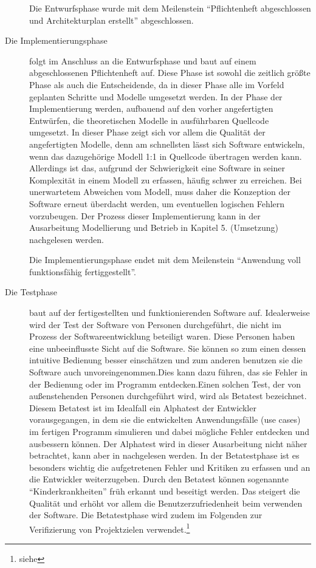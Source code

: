\begin{description}
  Die Entwurfsphase wurde mit dem Meilenstein "`Pflichtenheft abgeschlossen und
  Architekturplan erstellt"' abgeschlossen.

  \item[Die Implementierungsphase] folgt im Anschluss an die Entwurfsphase und
  baut auf einem abgeschlossenen Pflichtenheft auf. Diese Phase ist sowohl die
  zeitlich größte Phase als auch die Entscheidende, da in dieser Phase alle im
  Vorfeld geplanten Schritte und Modelle umgesetzt werden. In der Phase der
  Implementierung werden, aufbauend auf den vorher angefertigten Entwürfen, die
  theoretischen Modelle in ausführbaren Quellcode umgesetzt. In dieser Phase
  zeigt sich vor allem die Qualität der angefertigten Modelle, denn am
  schnellsten lässt sich Software entwickeln, wenn das dazugehörige Modell
  1:1 in Quellcode übertragen werden kann. Allerdings ist das, aufgrund der
  Schwierigkeit eine Software in seiner Komplexität in einem Modell zu erfassen,
  häufig schwer zu erreichen. Bei unerwartetem Abweichen vom Modell, muss daher
  die Konzeption der Software erneut überdacht werden, um eventuellen logischen
  Fehlern vorzubeugen. Der Prozess dieser Implementierung kann in der
  Ausarbeitung Modellierung und Betrieb in Kapitel 5. (Umsetzung) nachgelesen werden.

  Die Implementierungsphase endet mit dem Meilenstein "`Anwendung voll
  funktionsfähig fertiggestellt"'.

  \item[Die Testphase] baut auf der fertigestellten und funktionierenden Software auf.
  Idealerweise wird der Test der Software von Personen durchgeführt, die nicht im Prozess der
  Softwareentwicklung beteiligt waren. Diese Personen haben eine
  unbeeinflusste Sicht auf die Software. Sie können so zum einen dessen
  intuitive Bedienung besser einschätzen und zum anderen benutzen sie die Software auch
  unvoreingenommen.Dies kann dazu führen, das sie Fehler in der Bedienung oder
  im Programm entdecken.Einen solchen Test, der von außenstehenden Personen
  durchgeführt wird, wird als Betatest bezeichnet. Diesem Betatest ist im
  Idealfall ein Alphatest der Entwickler vorausgegangen, in dem sie die entwickelten Anwendungsfälle (use cases) im fertigen Programm simulieren und dabei mögliche
  Fehler entdecken und ausbessern können. Der Alphatest wird in dieser Ausarbeitung nicht näher betrachtet,
  kann aber in \citet{modelierungUndBetrieb2014} nachgelesen werden.
  In der Betatestphase ist es besonders wichtig die  aufgetretenen Fehler
  und Kritiken zu erfassen und an die Entwickler weiterzugeben. Durch den
  Betatest können sogenannte "`Kinderkrankheiten"' früh erkannt und beseitigt
  werden. Das steigert die Qualität und erhöht vor allem die
  Benutzerzufriedenheit beim verwenden der Software. Die Betatestphase wird zudem im Folgenden
  zur Verifizierung von Projektzielen verwendet.\footnote{siehe }


\end{description}

